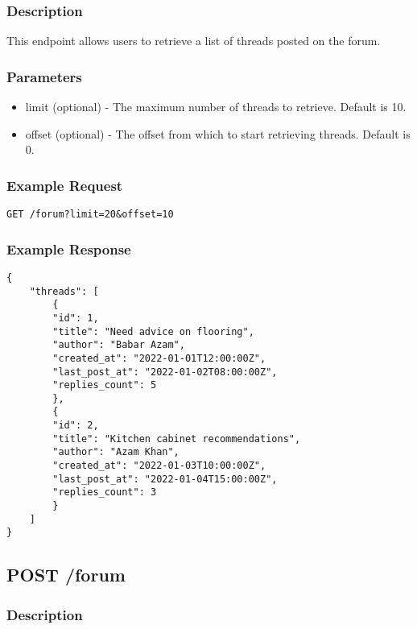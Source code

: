 \documentclass{article}
\begin{document}
\subsubsection{Description}

This endpoint allows users to retrieve a list of threads posted on the forum.

\subsubsection{Parameters}

\begin{itemize}
\item limit (optional) - The maximum number of threads to retrieve. Default is 10.
\item offset (optional) - The offset from which to start retrieving threads. Default is 0.
\end{itemize}

\subsubsection{Example Request}

\begin{verbatim}
GET /forum?limit=20&offset=10
\end{verbatim}

\subsubsection{Example Response}

\begin{verbatim}
{
    "threads": [
        {
        "id": 1,
        "title": "Need advice on flooring",
        "author": "Babar Azam",
        "created_at": "2022-01-01T12:00:00Z",
        "last_post_at": "2022-01-02T08:00:00Z",
        "replies_count": 5
        },
        {
        "id": 2,
        "title": "Kitchen cabinet recommendations",
        "author": "Azam Khan",
        "created_at": "2022-01-03T10:00:00Z",
        "last_post_at": "2022-01-04T15:00:00Z",
        "replies_count": 3
        }
    ]
}
\end{verbatim}

\subsection{POST /forum}

\subsubsection{Description}
\end{document}
